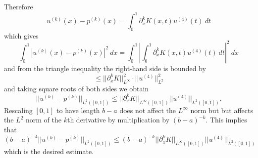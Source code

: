 \documentclass[10pt]{article}
\theoremstyle{definition}
\begin{document}
Therefore
$$u^{(k)}(x) - p^{(k)}(x) = \int_0^1 \partial_x^k K(x, t) u^{(4)}(t) ~dt$$
which gives
$$\int_0^1 |u^{(k)}(x) - p^{(k)}(x)|^2 ~dx = \int_0^1 \left|\int_0^1 \partial_x^k K(x, t) u^{(4)}(t) ~dt\right|^2 ~dx$$
and from the triangle inequality the right-hand side is bounded by
$$\leq ||\partial_x^k K||_{L^\infty}^2 \cdot ||u^{(4)}||_{L^2}^2$$
and taking square roots of both sides we obtain
$$||u^{(k)} - p^{(k)}||_{L^2([0, 1])} \leq ||\partial_x^k K||_{L^\infty([0, 1])} ||u^{(4)}||_{L^2([0, 1])}.$$
Rescaling $[0, 1]$ to have length $b - a$ does not affect the $L^\infty$ norm but but affects the $L^2$ norm of the $k$th derivative by multiplication by $(b - a)^{-k}$.
This implies that
$$(b - a)^{-4} ||u^{(k)} - p^{(k)}||_{L^2([0, 1])} \leq (b - a)^{-k} ||\partial_x^k K||_{L^\infty([0, 1])} ||u^{(4)}||_{L^2([0, 1])}$$
which is the desired estimate.
\end{document}

